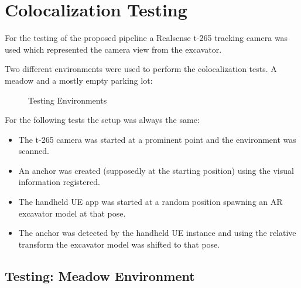 \section{Colocalization Testing}\label{sec:colocalization_testing}

For the testing of the proposed pipeline a Realsense t-265 tracking camera was used which represented the camera view from the excavator. 

Two different environments were used to perform the colocalization tests. A meadow and a mostly empty parking lot:

\begin{figure}[htp]
    \centering
        \hfill
        \hfill
    \caption{Testing Environments}
    \label{fig:environments}
\end{figure}

For the following tests the setup was always the same:
\begin{itemize}
    \item The t-265 camera was started at a prominent point and the environment was scanned.
    \item An anchor was created (supposedly at the starting position) using the visual information registered.
    \item The handheld UE app was started at a random position spawning an AR excavator model at that pose.
    \item The anchor was detected by the handheld UE instance and using the relative transform the excavator model was shifted to that pose.
\end{itemize}

\subsection{Testing: Meadow Environment}\label{subsec:meadow}



